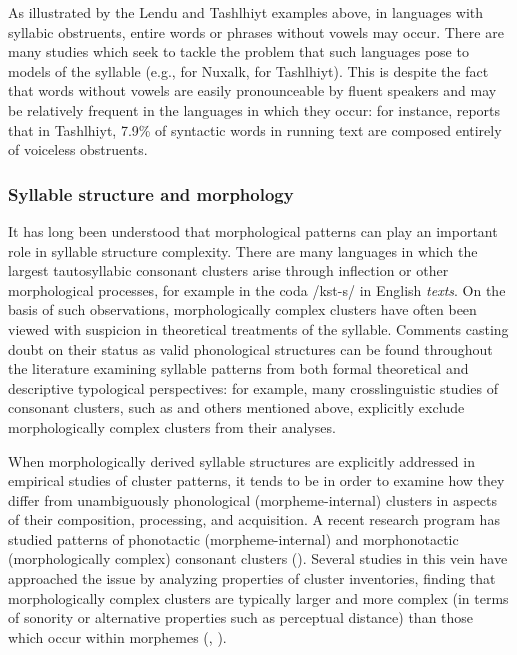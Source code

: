   As illustrated by the Lendu and Tashlhiyt examples above, in languages with syllabic obstruents, entire words or phrases without vowels may occur. There are many studies which seek to tackle the problem that such languages pose to models of the syllable (e.g., \citealt{Bagemihl1991} for Nuxalk, \citealt{Coleman2001} for Tashlhiyt). This is despite the fact that words without vowels are easily pronounceable by fluent speakers and may be relatively frequent in the languages in which they occur: for instance, \citet[328f]{Ridouane2008} reports that in Tashlhiyt, 7.9\% of syntactic words in running text are composed entirely of voiceless obstruents. 

\subsubsection{{Syllable} {structure} {and} {morphology}}\label{sec:1.1.2.5}

  It has long been understood that morphological patterns can play an important role in syllable structure complexity. There are many languages in which the largest tautosyllabic consonant clusters arise through inflection or other morphological processes, for example in the coda /kst-s/ in English \textit{texts}. On the basis of such observations, morphologically complex clusters have often been viewed with suspicion in theoretical treatments of the syllable. Comments casting doubt on their status as valid phonological structures can be found throughout the literature examining syllable patterns from both formal theoretical and descriptive typological perspectives: for example, many crosslinguistic studies of consonant clusters, such as \citet{Greenberg19651978} and others mentioned above, explicitly exclude morphologically complex clusters from their analyses. 

  When morphologically derived syllable structures are explicitly addressed in empirical studies of cluster patterns, it tends to be in order to examine how they differ from unambiguously phonological (morpheme-internal) clusters in aspects of their composition, processing, and acquisition. A recent research program has studied patterns of phonotactic (morpheme-internal) and morphonotactic (morphologically complex) consonant clusters (\citealt{DresslerDziubalska-Kołaczyk2006}). Several studies in this vein have approached the issue by analyzing properties of cluster inventories, finding that morphologically complex clusters are typically larger and more complex (in terms of sonority or alternative properties such as perceptual distance) than those which occur within morphemes (\citealt{DresslerDziubalska-Kołaczyk2006}, \citealt{Orzechowska2012}). 

